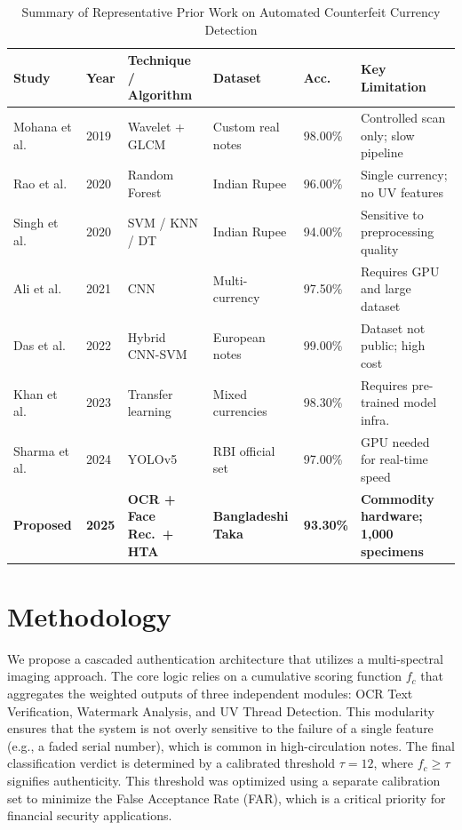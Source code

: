 \documentclass[journal]{IEEEtran}
\begin{document}
\begin{table}[!t]
\centering
\caption{Summary of Representative Prior Work on Automated Counterfeit Currency Detection}
\label{tab:literature}
\renewcommand{\arraystretch}{1.25}
\begin{tabularx}{\textwidth}{L{2.4cm} C{0.9cm} L{3.0cm} L{2.6cm} C{1.2cm} X}
\toprule
\textbf{Study} & \textbf{Year} & \textbf{Technique / Algorithm} & \textbf{Dataset} & \textbf{Acc.} & \textbf{Key Limitation} \\
\midrule
Mohana et al.~\cite{mohana2019} & 2019 & Wavelet + GLCM & Custom real notes & 98.00\% & Controlled scan only; slow pipeline \\
Rao et al.~\cite{rao2020} & 2020 & Random Forest & Indian Rupee & 96.00\% & Single currency; no UV features \\
Singh et al.~\cite{singh2020} & 2020 & SVM / KNN / DT & Indian Rupee & 94.00\% & Sensitive to preprocessing quality \\
Ali et al.~\cite{ali2021} & 2021 & CNN & Multi-currency & 97.50\% & Requires GPU and large dataset \\
Das et al.~\cite{das2022} & 2022 & Hybrid CNN-SVM & European notes & 99.00\% & Dataset not public; high cost \\
Khan et al.~\cite{khan2023} & 2023 & Transfer learning & Mixed currencies & 98.30\% & Requires pre-trained model infra. \\
Sharma et al.~\cite{sharma2024} & 2024 & YOLOv5 & RBI official set & 97.00\% & GPU needed for real-time speed \\
\midrule
\textbf{Proposed} & \textbf{2025} & \textbf{OCR + Face Rec.\ + HTA} & \textbf{Bangladeshi Taka} & \textbf{93.30\%} & \textbf{Commodity hardware; 1,000 specimens} \\
\bottomrule
\end{tabularx}
\end{table}

\section{Methodology}
\label{sec:methodology}
We propose a cascaded authentication architecture that utilizes a multi-spectral imaging approach. The core logic relies on a cumulative scoring function $f_c$ that aggregates the weighted outputs of three independent modules: OCR Text Verification, Watermark Analysis, and UV Thread Detection. This modularity ensures that the system is not overly sensitive to the failure of a single feature (e.g., a faded serial number), which is common in high-circulation notes. The final classification verdict is determined by a calibrated threshold $\tau = 12$, where $f_c \geq \tau$ signifies authenticity. This threshold was optimized using a separate calibration set to minimize the False Acceptance Rate (FAR), which is a critical priority for financial security applications.
\end{document}
